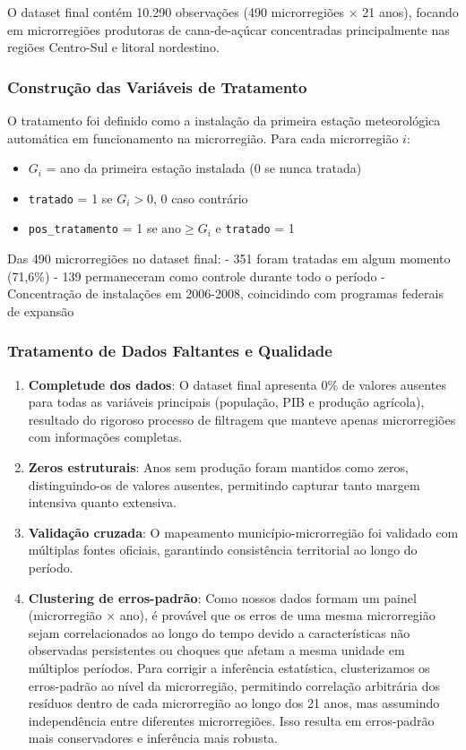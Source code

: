 \documentclass[
	12pt,				%
	oneside,			%
	a4paper,			%
	english,			%
	french,				%
	spanish,			%
	brazil				%
	]{abntex2}
\begin{document}
O dataset final contém 10.290 observações (490 microrregiões × 21 anos), focando em microrregiões produtoras de cana-de-açúcar concentradas principalmente nas regiões Centro-Sul e litoral nordestino. 

\subsubsection{Construção das Variáveis de Tratamento}

O tratamento foi definido como a instalação da primeira estação meteorológica automática em funcionamento na microrregião. Para cada microrregião $i$:

\begin{itemize}
\item $G_i$ = ano da primeira estação instalada (0 se nunca tratada)
\item \texttt{tratado} = 1 se $G_i > 0$, 0 caso contrário
\item \texttt{pos\_tratamento} = 1 se $\text{ano} \geq G_i$ e \texttt{tratado} = 1
\end{itemize}

Das 490 microrregiões no dataset final:
- 351 foram tratadas em algum momento (71,6\%)
- 139 permaneceram como controle durante todo o período
- Concentração de instalações em 2006-2008, coincidindo com programas federais de expansão

\subsubsection{Tratamento de Dados Faltantes e Qualidade}

\begin{enumerate}
\item \textbf{Completude dos dados}: O dataset final apresenta 0\% de valores ausentes para todas as variáveis principais (população, PIB e produção agrícola), resultado do rigoroso processo de filtragem que manteve apenas microrregiões com informações completas.

\item \textbf{Zeros estruturais}: Anos sem produção foram mantidos como zeros, distinguindo-os de valores ausentes, permitindo capturar tanto margem intensiva quanto extensiva.

\item \textbf{Validação cruzada}: O mapeamento município-microrregião foi validado com múltiplas fontes oficiais, garantindo consistência territorial ao longo do período.

\item \textbf{Clustering de erros-padrão}: Como nossos dados formam um painel (microrregião × ano), é provável que os erros de uma mesma microrregião sejam correlacionados ao longo do tempo devido a características não observadas persistentes ou choques que afetam a mesma unidade em múltiplos períodos. Para corrigir a inferência estatística, clusterizamos os erros-padrão ao nível da microrregião, permitindo correlação arbitrária dos resíduos dentro de cada microrregião ao longo dos 21 anos, mas assumindo independência entre diferentes microrregiões. Isso resulta em erros-padrão mais conservadores e inferência mais robusta.
\end{enumerate}
\end{document}
